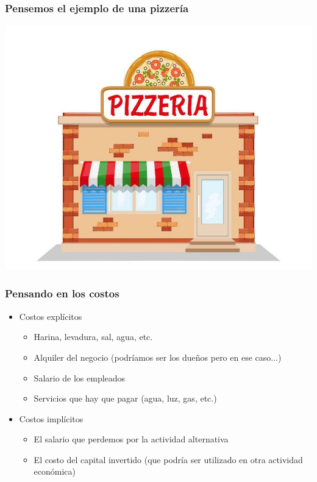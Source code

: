 \documentclass{beamer}
\begin{document}
\begin{frame}
\frametitle{Pensemos el ejemplo de una pizzería}
\centering
\includegraphics[scale=0.25]{../Figures/pizzeria.jpeg}
\end{frame}
        
\begin{frame}
    \frametitle{Pensando en los costos}
    \begin{itemize}
        \item Costos explícitos \vspace{2mm} 
        \begin{itemize}
            \item Harina, levadura, sal, agua, etc.
            \item Alquiler del negocio (podríamos ser los dueños pero en ese caso...)
            \item Salario de los empleados 
            \item Servicios que hay que pagar (agua, luz, gas, etc.) \vspace{2mm} 
        \end{itemize}
        \item Costos implícitos \vspace{2mm} 
        \begin{itemize}
            \item El salario que perdemos por la actividad alternativa
            \item El costo del capital invertido (que podría ser utilizado en otra actividad económica)
        \end{itemize}
    \end{itemize}
\end{frame}
\end{document}
